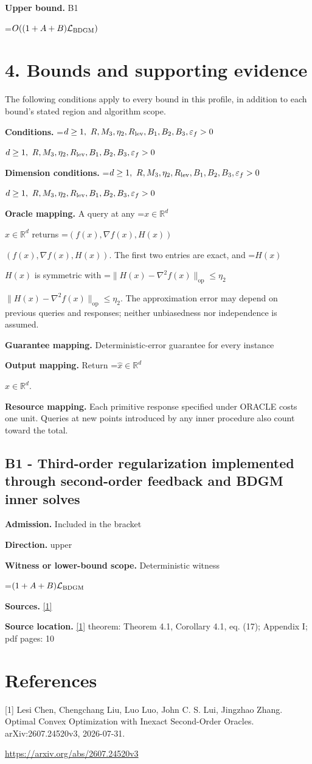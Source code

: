 \documentclass[10pt,a4paper]{article}
\newcommand{\AtlasMath}[1]{\par\begingroup\centering\setbox0=\hbox{$\displaystyle #1$}\ifdim\wd0>1.4\linewidth\typeout{ATLAS WIDE FORMULA: \the\wd0}\fi\ifdim\wd0>\linewidth\resizebox{\linewidth}{!}{\box0}\else\box0\fi\par\endgroup}
\newcommand{\AtlasInlineMath}[1]{\begingroup\setbox0=\hbox{$#1$}\ifdim\wd0>.4\linewidth\endgroup\AtlasMath{#1}\else\endgroup$#1$\fi}
\begin{document}
\textbf{Upper bound.} B1

\AtlasMath{O((1+A+B)\mathcal{L}_{\rm BDGM})}
\section{4. Bounds and supporting evidence}
The following conditions apply to every bound in this profile, in addition to each bound's stated region and algorithm scope.

\textbf{Conditions.} \AtlasInlineMath{d\ge1,\ R,M_3,\eta_2,R_{\rm lev},B_1,B_2,B_3,\varepsilon_f>0}

\textbf{Dimension conditions.} \AtlasInlineMath{d\ge1,\ R,M_3,\eta_2,R_{\rm lev},B_1,B_2,B_3,\varepsilon_f>0}

\textbf{Oracle mapping.} A query at any \AtlasInlineMath{x\in\mathbb{R}^d} returns \AtlasInlineMath{(f(x),\nabla f(x),H(x))}. The first two entries are exact, and \AtlasInlineMath{H(x)} is symmetric with \AtlasInlineMath{\|H(x)-\nabla^2f(x)\|_{\mathrm{op}}\le\eta_2}. The approximation error may depend on previous queries and responses; neither unbiasedness nor independence is assumed.

\textbf{Guarantee mapping.} Deterministic-error guarantee for every instance

\textbf{Output mapping.} Return \AtlasInlineMath{\widehat{x}\in \mathbb{R}^d}.

\textbf{Resource mapping.} Each primitive response specified under ORACLE costs one unit. Queries at new points introduced by any inner procedure also count toward the total.

\subsection{B1 - Third-order regularization implemented through second-order feedback and BDGM inner solves}
\textbf{Admission.} Included in the bracket

\textbf{Direction.} upper

\textbf{Witness or lower-bound scope.} Deterministic witness

\AtlasMath{(1+A+B)\mathcal{L}_{\rm BDGM}}
\textbf{Sources.} \href{https://arxiv.org/abs/2607.24520v3}{[1]}

\textbf{Source location.} \href{https://arxiv.org/abs/2607.24520v3}{[1]} theorem: Theorem 4.1, Corollary 4.1, eq. (17); Appendix I; pdf pages: 10

\section{References}
[1] Lesi Chen, Chengchang Liu, Luo Luo, John C. S. Lui, Jingzhao Zhang. Optimal Convex Optimization with Inexact Second-Order Oracles. arXiv:2607.24520v3, 2026-07-31.

\url{https://arxiv.org/abs/2607.24520v3}
\end{document}
